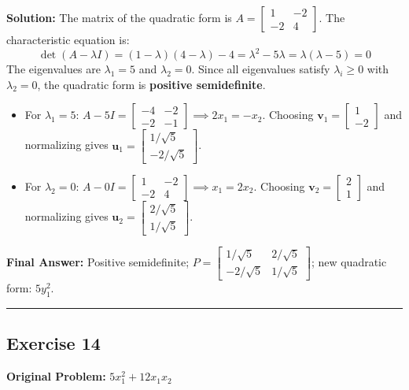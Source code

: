 \documentclass[11pt, letterpaper]{article}
\theoremstyle{definition}
\theoremstyle{remark}
\begin{document}
\textbf{Solution:}
The matrix of the quadratic form is $A = \begin{bmatrix} 1 & -2 \\ -2 & 4 \end{bmatrix}$.
The characteristic equation is:
\[
\det(A - \lambda I) = (1 - \lambda)(4 - \lambda) - 4 = \lambda^2 - 5\lambda = \lambda(\lambda - 5) = 0
\]
The eigenvalues are $\lambda_1 = 5$ and $\lambda_2 = 0$. Since all eigenvalues satisfy $\lambda_i \ge 0$ with $\lambda_2 = 0$, the quadratic form is \textbf{positive semidefinite}.
\begin{itemize}
    \item For $\lambda_1 = 5$: $A - 5I = \begin{bmatrix} -4 & -2 \\ -2 & -1 \end{bmatrix} \implies 2x_1 = -x_2$. Choosing $\mathbf{v}_1 = \begin{bmatrix} 1 \\ -2 \end{bmatrix}$ and normalizing gives $\mathbf{u}_1 = \begin{bmatrix} 1/\sqrt{5} \\ -2/\sqrt{5} \end{bmatrix}$.
    \item For $\lambda_2 = 0$: $A - 0I = \begin{bmatrix} 1 & -2 \\ -2 & 4 \end{bmatrix} \implies x_1 = 2x_2$. Choosing $\mathbf{v}_2 = \begin{bmatrix} 2 \\ 1 \end{bmatrix}$ and normalizing gives $\mathbf{u}_2 = \begin{bmatrix} 2/\sqrt{5} \\ 1/\sqrt{5} \end{bmatrix}$.
\end{itemize}
\textbf{Final Answer:} Positive semidefinite; $P = \begin{bmatrix} 1/\sqrt{5} & 2/\sqrt{5} \\ -2/\sqrt{5} & 1/\sqrt{5} \end{bmatrix}$; new quadratic form: $5y_1^2$.

\medskip\hrule\medskip

\subsection*{Exercise 14}
\textbf{Original Problem:} $5x_1^2 + 12x_1x_2$
\end{document}
